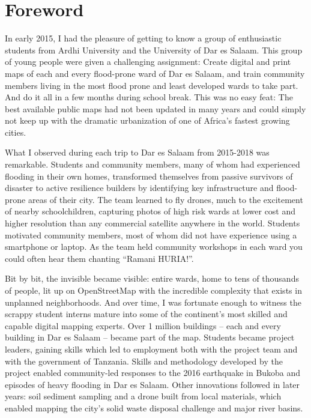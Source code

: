 \documentclass[a4paper,12pt,twoside]{article}
\begin{document}
\section{Foreword}
\begin{multicols}{2}
In early 2015, I had the pleasure of getting to know a group of enthusiastic students from Ardhi University and the University of Dar es Salaam. This group of young people were given a challenging assignment: Create digital and print maps of each and every flood-prone ward of Dar es Salaam, and train community members living in the most flood prone and least developed wards to take part. And do it all in a few months during school break. This was no easy feat: The best available public maps had not been updated in many years and could simply not keep up with the dramatic urbanization of one of Africa’s fastest growing cities.
 
What I observed during each trip to Dar es Salaam from 2015-2018 was remarkable. Students and community members, many of whom had experienced flooding in their own homes, transformed themselves from passive survivors of disaster to active resilience builders by identifying key infrastructure and flood-prone areas of their city. The team learned to fly drones, much to the excitement of nearby schoolchildren, capturing photos of high risk wards at lower cost and higher resolution than any commercial satellite anywhere in the world. Students motivated community members, most of whom did not have experience using a smartphone or laptop. As the team held community workshops in each ward you could often hear them chanting “Ramani HURIA!”.
 
Bit by bit, the invisible became visible: entire wards, home to tens of thousands of people, lit up on OpenStreetMap with the incredible complexity that exists in unplanned neighborhoods. And over time, I was fortunate enough to witness the scrappy student interns mature into some of the continent’s most skilled and capable digital mapping experts. Over 1 million buildings – each and every building in Dar es Salaam – became part of the map. Students became project leaders, gaining skills which led to employment both with the project team and with the government of Tanzania. Skills and methodology developed by the project enabled community-led responses to the 2016 earthquake in Bukoba and episodes of heavy flooding in Dar es Salaam. Other innovations followed in later years: soil sediment sampling and a drone built from local materials, which enabled mapping the city’s solid waste disposal challenge and major river basins.
 

\end{multicols}
\end{document}
